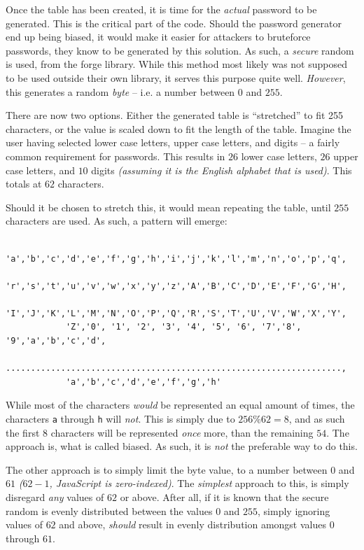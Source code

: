 		Once the table has been created, it is time for the \emph{actual} password to be generated. This is the critical part of the code. Should the password generator end up being biased, it would make it easier for attackers to bruteforce passwords, they know to be generated by this solution. As such, a \emph{secure} random is used, from the forge library. While this method most likely was not supposed to be used outside their own library, it serves this purpose quite well. \emph{However}, this generates a random \emph{byte} -- i.e. a number between $0$ and $255$.

		There are now two options. Either the generated table is ``stretched'' to fit 255 characters, or the value is scaled down to fit the length of the table. Imagine the user having selected lower case letters, upper case letters, and digits -- a fairly common requirement for passwords. This results in $26$ lower case letters, $26$ upper case letters, and $10$ digits \emph{(assuming it is the English alphabet that is used)}. This totals at $62$ characters.

		Should it be chosen to stretch this, it would mean repeating the table, until $255$ characters are used. As such, a pattern will emerge:
		\begin{verbatim}
			'a','b','c','d','e','f','g','h','i','j','k','l','m','n','o','p','q',
			'r','s','t','u','v','w','x','y','z','A','B','C','D','E','F','G','H',
			'I','J','K','L','M','N','O','P','Q','R','S','T','U','V','W','X','Y',
			'Z','0', '1', '2', '3', '4', '5', '6', '7','8', '9','a','b','c','d',
			...................................................................,
			'a','b','c','d','e','f','g','h'
		\end{verbatim}
		While most of the characters \emph{would} be represented an equal amount of times, the characters \verb=a= through \verb=h= will \emph{not}. This is simply due to $256\%62=8$, and as such the first $8$ characters will be represented \emph{once} more, than the remaining $54$. The approach is, what is called biased. As such, it is \emph{not} the preferable way to do this.

		The other approach is to simply limit the byte value, to a number between $0$ and $61$ \emph{($62-1$, JavaScript is zero-indexed)}. The \emph{simplest} approach to this, is simply disregard \emph{any} values of $62$ or above. After all, if it is known that the secure random is evenly distributed between the values $0$ and $255$, simply ignoring values of $62$ and above, \emph{should} result in evenly distribution amongst values $0$ through $61$. 

